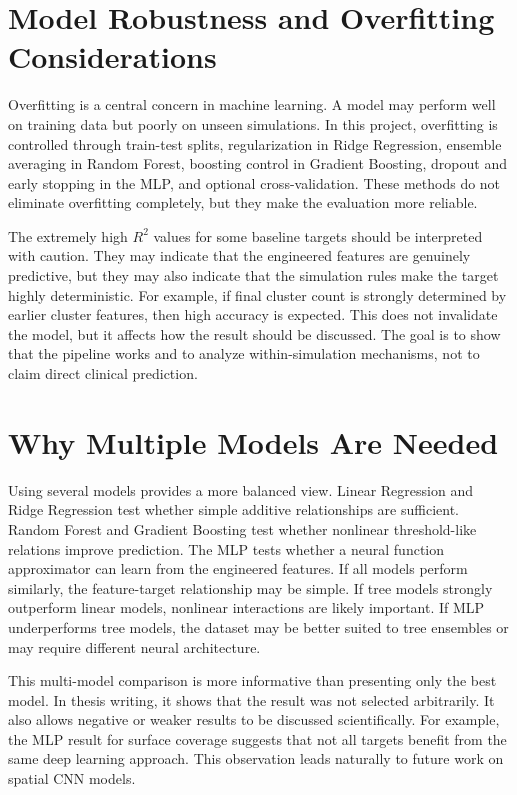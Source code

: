 \documentclass[12pt,a4paper,oneside]{report}
\begin{document}
\section{Model Robustness and Overfitting Considerations}
Overfitting is a central concern in machine learning. A model may perform well on training data but poorly on unseen simulations. In this project, overfitting is controlled through train-test splits, regularization in Ridge Regression, ensemble averaging in Random Forest, boosting control in Gradient Boosting, dropout and early stopping in the MLP, and optional cross-validation. These methods do not eliminate overfitting completely, but they make the evaluation more reliable.

The extremely high \(R^2\) values for some baseline targets should be interpreted with caution. They may indicate that the engineered features are genuinely predictive, but they may also indicate that the simulation rules make the target highly deterministic. For example, if final cluster count is strongly determined by earlier cluster features, then high accuracy is expected. This does not invalidate the model, but it affects how the result should be discussed. The goal is to show that the pipeline works and to analyze within-simulation mechanisms, not to claim direct clinical prediction.

\section{Why Multiple Models Are Needed}
Using several models provides a more balanced view. Linear Regression and Ridge Regression test whether simple additive relationships are sufficient. Random Forest and Gradient Boosting test whether nonlinear threshold-like relations improve prediction. The MLP tests whether a neural function approximator can learn from the engineered features. If all models perform similarly, the feature-target relationship may be simple. If tree models strongly outperform linear models, nonlinear interactions are likely important. If MLP underperforms tree models, the dataset may be better suited to tree ensembles or may require different neural architecture.

This multi-model comparison is more informative than presenting only the best model. In thesis writing, it shows that the result was not selected arbitrarily. It also allows negative or weaker results to be discussed scientifically. For example, the MLP result for surface coverage suggests that not all targets benefit from the same deep learning approach. This observation leads naturally to future work on spatial CNN models.
\end{document}
